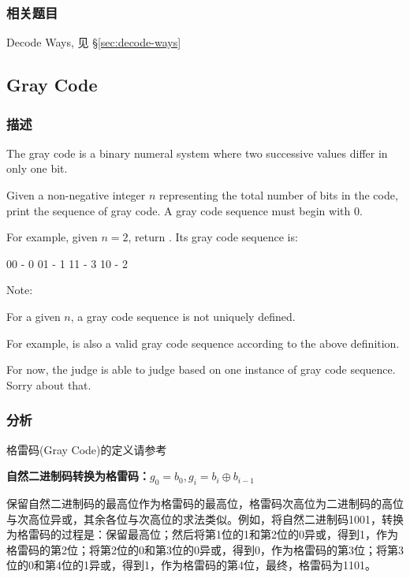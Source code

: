 \subsubsection{相关题目}
\begindot
\item Decode Ways, 见 \S \ref{sec:decode-ways}
\myenddot


\subsection{Gray Code} %
\label{sec:gray-code}


\subsubsection{描述}
The gray code is a binary numeral system where two successive values differ in 
only one bit.

Given a non-negative integer $n$ representing the total number of bits in the 
code, print the sequence of gray code. A gray code sequence must begin with 0.

For example, given $n = 2$, return \fn{[0,1,3,2]}. Its gray code sequence is:
\begin{Code}
	00 - 0
	01 - 1
	11 - 3
	10 - 2
\end{Code}

Note:
\begindot
\item For a given $n$, a gray code sequence is not uniquely defined.
\item For example, \fn{[0,2,3,1]} is also a valid gray code sequence according 
to the above definition.
\item For now, the judge is able to judge based on one instance of gray code 
sequence. Sorry about that.
\myenddot


\subsubsection{分析}
格雷码(Gray Code)的定义请参考 

\textbf{自然二进制码转换为格雷码：$g_0=b_0, g_i=b_i \oplus b_{i-1}$}

保留自然二进制码的最高位作为格雷码的最高位，格雷码次高位为二进制码的高位与次高位异或，其余各位与次高位的求法类似。例如，将自然二进制码1001，转换为格雷码的过程是：保留最高位；然后将第1位的1和第2位的0异或，得到1，作为格雷码的第2位；将第2位的0和第3位的0异或，得到0，作为格雷码的第3位；将第3位的0和第4位的1异或，得到1，作为格雷码的第4位，最终，格雷码为1101。

